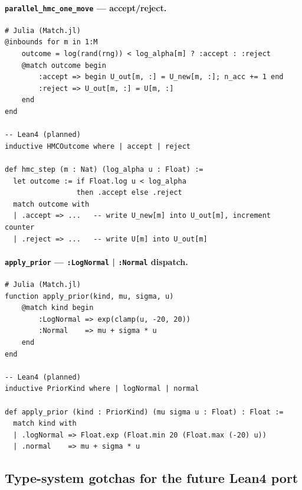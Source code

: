 \documentclass[11pt,a4paper]{article}
\begin{document}
\paragraph{\texttt{parallel\_hmc\_one\_move} — accept/reject.}

\begin{lstlisting}
# Julia (Match.jl)
@inbounds for m in 1:M
    outcome = log(rand(rng)) < log_alpha[m] ? :accept : :reject
    @match outcome begin
        :accept => begin U_out[m, :] = U_new[m, :]; n_acc += 1 end
        :reject => U_out[m, :] = U[m, :]
    end
end

-- Lean4 (planned)
inductive HMCOutcome where | accept | reject

def hmc_step (m : Nat) (log_alpha u : Float) :=
  let outcome := if Float.log u < log_alpha
                 then .accept else .reject
  match outcome with
  | .accept => ...   -- write U_new[m] into U_out[m], increment counter
  | .reject => ...   -- write U[m] into U_out[m]
\end{lstlisting}

\paragraph{\texttt{apply\_prior} — \texttt{:LogNormal} | \texttt{:Normal} dispatch.}

\begin{lstlisting}
# Julia (Match.jl)
function apply_prior(kind, mu, sigma, u)
    @match kind begin
        :LogNormal => exp(clamp(u, -20, 20))
        :Normal    => mu + sigma * u
    end
end

-- Lean4 (planned)
inductive PriorKind where | logNormal | normal

def apply_prior (kind : PriorKind) (mu sigma u : Float) : Float :=
  match kind with
  | .logNormal => Float.exp (Float.min 20 (Float.max (-20) u))
  | .normal    => mu + sigma * u
\end{lstlisting}

\subsection{Type-system gotchas for the future Lean4 port}
\end{document}
